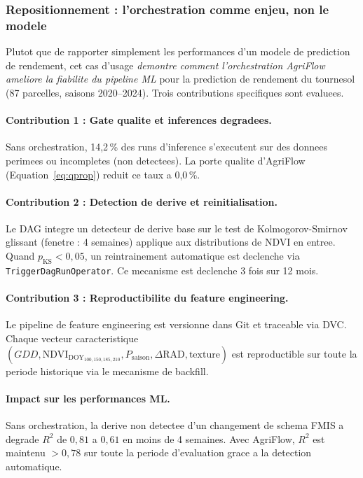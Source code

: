 \documentclass[12pt,a4paper]{article}
\theoremstyle{plain}
\theoremstyle{definition}
\theoremstyle{remark}
\begin{document}
	\subsubsection{Repositionnement : l'orchestration comme enjeu, non le modele}
	
	Plutot que de rapporter simplement les performances d'un modele de
	prediction de rendement, cet cas d'usage \emph{demontre comment
		l'orchestration AgriFlow ameliore la fiabilite du pipeline ML}
	pour la prediction de rendement du tournesol (87 parcelles,
	saisons 2020--2024). Trois contributions specifiques sont evaluees.
	
	\paragraph{Contribution 1 : Gate qualite et inferences degradees.}
	Sans orchestration, 14,2\,\% des runs d'inference s'executent sur
	des donnees perimees ou incompletes (non detectees). La porte qualite
	d'AgriFlow (Equation~\ref{eq:qprop}) reduit ce taux a 0,0\,\%.
	
	\paragraph{Contribution 2 : Detection de derive et reinitialisation.}
	Le DAG integre un detecteur de derive base sur le test de
	Kolmogorov-Smirnov glissant (fenetre : 4 semaines) applique aux
	distributions de NDVI en entree. Quand $p_{\text{KS}} < 0{,}05$,
	un reintrainement automatique est declenche via
	\texttt{TriggerDagRunOperator}. Ce mecanisme est declenche 3 fois
	sur 12 mois.
	
	\paragraph{Contribution 3 : Reproductibilite du feature engineering.}
	Le pipeline de feature engineering est versionne dans Git et
	traceable via DVC. Chaque vecteur caracteristique
	$(GDD, \text{NDVI}_{\text{DOY}_{100,150,185,210}},
	P_{\text{saison}}, \Delta\text{RAD}, \text{texture})$
	est reproductible sur toute la periode historique via le
	mecanisme de backfill.
	
	\paragraph{Impact sur les performances ML.}
	Sans orchestration, la derive non detectee d'un changement de schema
	FMIS a degrade $R^2$ de $0{,}81$ a $0{,}61$ en moins de 4 semaines.
	Avec AgriFlow, $R^2$ est maintenu $> 0{,}78$ sur toute la periode
	d'evaluation grace a la detection automatique.
	
\end{document}
